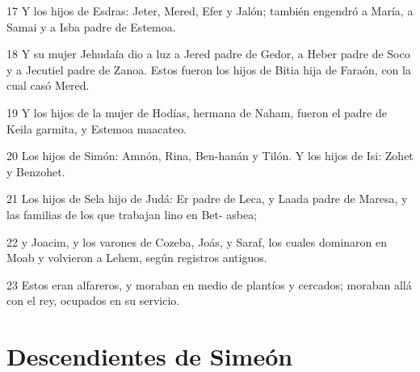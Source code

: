 \par 17 Y los hijos de Esdras: Jeter, Mered, Efer y Jalón; también engendró a María, a Samai y a Isba padre de Estemoa.
\par 18 Y su mujer Jehudaía dio a luz a Jered padre de Gedor, a Heber padre de Soco y a Jecutiel padre de Zanoa. Estos fueron los hijos de Bitia hija de Faraón, con la cual casó Mered.
\par 19 Y los hijos de la mujer de Hodías, hermana de Naham, fueron el padre de Keila garmita, y Estemoa maacateo.
\par 20 Los hijos de Simón: Amnón, Rina, Ben-hanán y Tilón. Y los hijos de Isi: Zohet y Benzohet.
\par 21 Los hijos de Sela hijo de Judá: Er padre de Leca, y Laada padre de Maresa, y las familias de los que trabajan lino en Bet- asbea;
\par 22 y Joacim, y los varones de Cozeba, Joás, y Saraf, los cuales dominaron en Moab y volvieron a Lehem, según registros antiguos.
\par 23 Estos eran alfareros, y moraban en medio de plantíos y cercados; moraban allá con el rey, ocupados en su servicio.

\section*{Descendientes de Simeón}

